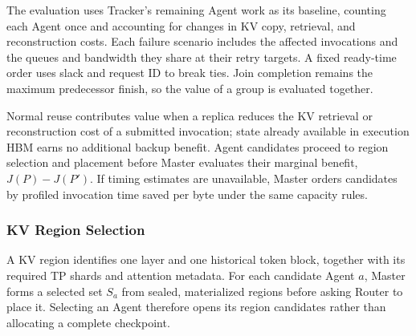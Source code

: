 The evaluation uses Tracker's remaining Agent work as its baseline,
counting each Agent once and accounting for changes in KV copy,
retrieval, and reconstruction costs. Each failure scenario includes the
affected invocations and the queues and bandwidth they share at their
retry targets. A fixed ready-time order uses slack and request ID to
break ties. Join completion remains the maximum predecessor finish,
so the value of a group is evaluated together.

Normal reuse contributes value when a replica reduces the KV retrieval
or reconstruction cost of a submitted invocation; state already
available in execution HBM earns no additional backup benefit.
Agent candidates proceed to region selection and placement before
Master evaluates their marginal benefit, $J(P)-J(P')$.
If timing estimates are unavailable, Master orders candidates by
profiled invocation time saved per byte under the same capacity rules.

\subsubsection{KV Region Selection}
\label{sec:region-selection}

A KV region identifies one layer and one historical token block,
together with its required TP shards and attention metadata.
For each candidate Agent $a$, Master forms a selected set $S_a$ from
sealed, materialized regions before asking Router to place it.
Selecting an Agent therefore opens its region candidates rather than
allocating a complete checkpoint.

